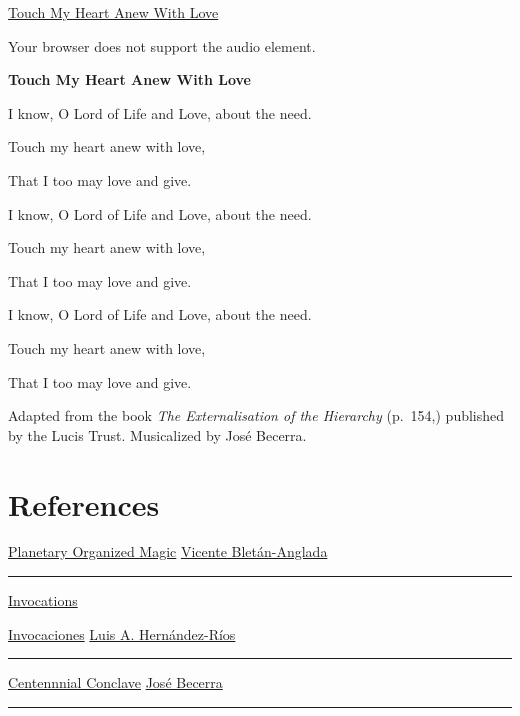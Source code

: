 \documentclass[
]{book}
\begin{document}
\href{https://ngsm.org/mp3/Touch\%20My\%20Heart\%20Anew\%20With\%20Love.mp3}{Touch My Heart Anew With Love}

Your browser does not support the audio element.

\textbf{Touch My Heart Anew With Love}

I know, O Lord of Life and Love, about the need.

Touch my heart anew with love,

That I too may love and give.

I know, O Lord of Life and Love, about the need.

Touch my heart anew with love,

That I too may love and give.

I know, O Lord of Life and Love, about the need.

Touch my heart anew with love,

That I too may love and give.

Adapted from the book \emph{The Externalisation of the Hierarchy} (p.~154,) published by the Lucis Trust. Musicalized by José Becerra.

\hypertarget{references}{%
\chapter*{References}\label{references}}

\href{https://transhimalayica.mx/producto/planetary-organized-magic/}{Planetary Organized Magic}
\href{https://transhimalayica.mx/autor/vba/}{Vicente Bletán-Anglada}

\begin{center}\rule{0.5\linewidth}{0.5pt}\end{center}

\href{https://transhimalayica.mx/producto/invocations-meditative-outlines/}{Invocations}

\href{https://transhimalayica.mx/producto/invocaciones/}{Invocaciones}
\href{https://transhimalayica.mx/autor/lahr/}{Luis A. Hernández-Ríos}

\begin{center}\rule{0.5\linewidth}{0.5pt}\end{center}

\href{https://transhimalayica.mx/producto/the-centennial-conclave/}{Centennnial Conclave}
\href{https://transhimalayica.mx/autor/jeb/}{José Becerra}

\begin{center}\rule{0.5\linewidth}{0.5pt}\end{center}
\end{document}
